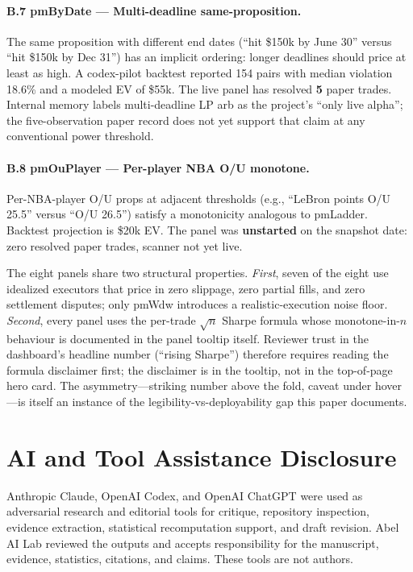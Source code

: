 \documentclass[11pt]{article}
\begin{document}
\paragraph{B.7 pmByDate --- Multi-deadline same-proposition.}
The same proposition with different end dates (``hit \$150k by June 30'' versus ``hit \$150k by Dec 31'') has an implicit ordering: longer deadlines should price at least as high. A codex-pilot backtest reported 154 pairs with median violation 18.6\% and a modeled EV of \$55k. The live panel has resolved \textbf{5} paper trades. Internal memory labels multi-deadline LP arb as the project's ``only live alpha''; the five-observation paper record does not yet support that claim at any conventional power threshold.

\paragraph{B.8 pmOuPlayer --- Per-player NBA O/U monotone.}
Per-NBA-player O/U props at adjacent thresholds (e.g., ``LeBron points O/U 25.5'' versus ``O/U 26.5'') satisfy a monotonicity analogous to pmLadder. Backtest projection is \$20k EV. The panel was \textbf{unstarted} on the snapshot date: zero resolved paper trades, scanner not yet live.

The eight panels share two structural properties. \emph{First}, seven of the eight use idealized executors that price in zero slippage, zero partial fills, and zero settlement disputes; only pmWdw introduces a realistic-execution noise floor. \emph{Second}, every panel uses the per-trade $\sqrt{n}$ Sharpe formula whose monotone-in-$n$ behaviour is documented in the panel tooltip itself. Reviewer trust in the dashboard's headline number (``rising Sharpe'') therefore requires reading the formula disclaimer first; the disclaimer is in the tooltip, not in the top-of-page hero card. The asymmetry---striking number above the fold, caveat under hover---is itself an instance of the legibility-vs-deployability gap this paper documents.

\section*{AI and Tool Assistance Disclosure}
Anthropic Claude, OpenAI Codex, and OpenAI ChatGPT were used as adversarial research and editorial tools for critique, repository inspection, evidence extraction, statistical recomputation support, and draft revision. Abel AI Lab reviewed the outputs and accepts responsibility for the manuscript, evidence, statistics, citations, and claims. These tools are not authors.
\end{document}
